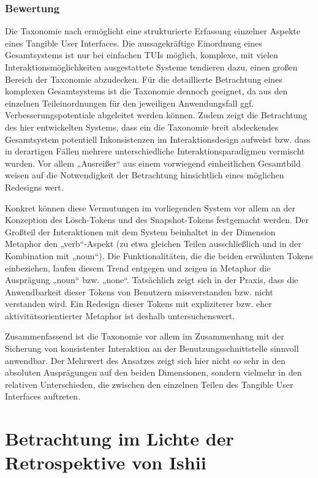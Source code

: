 \subsubsection{Bewertung}

Die Taxonomie nach \citeauthor{Fishkin04} ermöglicht eine strukturierte Erfassung einzelner Aspekte eines Tangible User Interfaces. Die aussagekräftige Einordnung eines Gesamtsystems  ist nur bei einfachen \glspl{TUI} möglich, komplexe, mit vielen Interaktionsmöglichkeiten ausgestattete Systeme tendieren dazu, einen großen Bereich der Taxonomie abzudecken. Für die detaillierte Betrachtung eines komplexen Gesamtsystems ist die Taxonomie dennoch geeignet, da aus den einzelnen Teileinordnungen für den jeweiligen Anwendungsfall ggf. Verbesserungspotentiale abgeleitet werden können. Zudem zeigt die Betrachtung des hier entwickelten Systems, dass ein die Taxonomie breit abdeckendes Gesamtsystem potentiell Inkonsistenzen im Interaktionsdesign aufweist bzw. dass in derartigen Fällen mehrere unterschiedliche Interaktionsparadigmen vermischt wurden. Vor allem „Ausreißer“ aus einem vorwiegend einheitlichen Gesamtbild weisen auf die Notwendigkeit der Betrachtung hinsichtlich eines möglichen Redesigns wert.

Konkret können diese Vermutungen im vorliegenden System vor allem an der Konzeption des Lösch-Tokens und des Snapshot-Tokens festgemacht werden. Der Großteil der Interaktionen mit dem System beinhaltet in der Dimension Metaphor den „verb“-Aspekt (zu etwa gleichen Teilen ausschließlich und in der Kombination mit „noun“). Die Funktionalitäten, die die beiden erwähnten Tokens einbeziehen, laufen diesem Trend entgegen und zeigen in Metaphor die Ausprägung „noun“ bzw. „none“. Tatsächlich zeigt sich in der Praxis, dass die Anwendbarkeit dieser Tokens von Benutzern missverstanden bzw. nicht verstanden wird. Ein Redesign dieser Tokens mit expliziterer bzw. eher aktivitätsorientierter Metaphor ist deshalb untersuchenswert.

Zusammenfassend ist die Taxonomie vor allem im Zusammenhang mit der Sicherung von konsistenter Interaktion an der Benutzungsschnittstelle sinnvoll anwendbar. Der Mehrwert des Ansatzes zeigt sich hier nicht so sehr in den absoluten Ausprägungen auf den beiden Dimensionen, sondern vielmehr in den relativen Unterschieden, die zwischen den einzelnen Teilen des Tangible User Interfaces auftreten.


\section{Betrachtung im Lichte der Retrospektive von Ishii} %
\label{sec:betrachtung_im_lichte_der_retrospektive_von_ishii}

